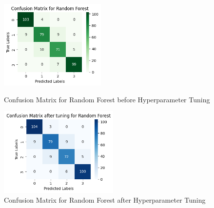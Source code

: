 \documentclass[12pt]{report}
\begin{document}
\begin{figure}[H]
    \centering
		\begin{minipage}{0.45\textwidth}
			\centering
			\includegraphics[height=12em]{cmat_RF.png}
			\caption{Confusion Matrix for Random Forest before Hyperparameter Tuning}
			\label{cmat_RF}
		\end{minipage}
    \hfill
    \begin{minipage}{0.45\textwidth}
        \centering
        \includegraphics[height=12em]{cmat_tuned_RF.png}
        \caption{Confusion Matrix for Random Forest after Hyperparameter Tuning}
        \label{cmat_tuned_RF}
    \end{minipage}
\end{figure}
\end{document}
